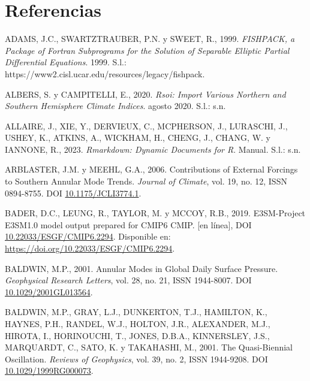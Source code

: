 \documentclass[12pt,oneside,a4paper]{reedthesis}
\newlength{\cslhangindent}
\newenvironment{CSLReferences}[2] %
 {%
  \setlength{\parindent}{0pt}
  \ifodd #1 \everypar{\setlength{\hangindent}{\cslhangindent}}\ignorespaces\fi
  \ifnum #2 > 0
  \setlength{\parskip}{#2\baselineskip}
  \fi
 }%
 {}
\begin{document}
\backmatter

\hypertarget{referencias}{%
\chapter*{Referencias}\label{referencias}}


\noindent

\setlength{\parindent}{-0.20in}

\hypertarget{refs}{}
\begin{CSLReferences}{1}{0}
\leavevmode{}%
ADAMS, J.C., SWARTZTRAUBER, P.N. y SWEET, R., 1999. \emph{{FISHPACK}, a Package of {Fortran} Subprograms for the Solution of Separable Elliptic Partial Differential Equations}. 1999. S.l.: https://www2.cisl.ucar.edu/resources/legacy/fishpack.

\leavevmode{}%
ALBERS, S. y CAMPITELLI, E., 2020. \emph{Rsoi: {Import Various Northern} and {Southern Hemisphere Climate Indices}}. agosto 2020. S.l.: s.n.

\leavevmode{}%
ALLAIRE, J., XIE, Y., DERVIEUX, C., MCPHERSON, J., LURASCHI, J., USHEY, K., ATKINS, A., WICKHAM, H., CHENG, J., CHANG, W. y IANNONE, R., 2023. \emph{Rmarkdown: {Dynamic} Documents for {R}}. Manual. S.l.: s.n.

\leavevmode{}%
ARBLASTER, J.M. y MEEHL, G.A., 2006. Contributions of {External Forcings} to {Southern Annular Mode Trends}. \emph{Journal of Climate}, vol. 19, no. 12, ISSN 0894-8755. DOI \href{https://doi.org/10.1175/JCLI3774.1}{10.1175/JCLI3774.1}.

\leavevmode{}%
BADER, D.C., LEUNG, R., TAYLOR, M. y MCCOY, R.B., 2019. E3SM-Project E3SM1.0 model output prepared for CMIP6 CMIP. {[}en línea{]}, DOI \href{https://doi.org/10.22033/ESGF/CMIP6.2294}{10.22033/ESGF/CMIP6.2294}. Disponible en: \url{https://doi.org/10.22033/ESGF/CMIP6.2294}.

\leavevmode{}%
BALDWIN, M.P., 2001. Annular Modes in Global Daily Surface Pressure. \emph{Geophysical Research Letters}, vol. 28, no. 21, ISSN 1944-8007. DOI \href{https://doi.org/10.1029/2001GL013564}{10.1029/2001GL013564}.

\leavevmode{}%
BALDWIN, M.P., GRAY, L.J., DUNKERTON, T.J., HAMILTON, K., HAYNES, P.H., RANDEL, W.J., HOLTON, J.R., ALEXANDER, M.J., HIROTA, I., HORINOUCHI, T., JONES, D.B.A., KINNERSLEY, J.S., MARQUARDT, C., SATO, K. y TAKAHASHI, M., 2001. The Quasi-Biennial Oscillation. \emph{Reviews of Geophysics}, vol. 39, no. 2, ISSN 1944-9208. DOI \href{https://doi.org/10.1029/1999RG000073}{10.1029/1999RG000073}.


\end{CSLReferences}
\end{document}
